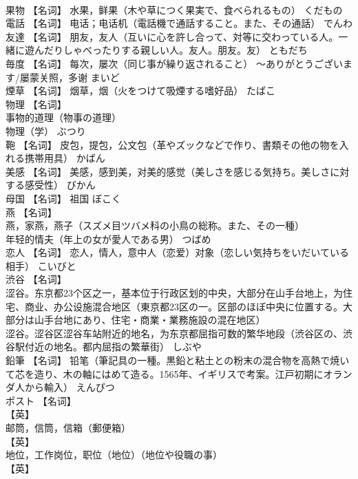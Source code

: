 \documentclass[8pt]{extreport}
\begin{document}
\begin{CJK}{UTF8}{min}
\\	果物	【名词】 水果，鲜果（木や草につく果実で、食べられるもの）	くだもの	
\\	電話	【名词】 电话；电话机（電話機で通話すること。また、その通話）	でんわ	
\\	友達	【名词】 朋友，友人（互いに心を許し合って、対等に交わっている人。一緒に遊んだりしゃべったりする親しい人。友人。朋友。友）	ともだち	
\\	毎度	【名词】 每次，屡次（同じ事が繰り返されること） ～ありがとうございます/屡蒙关照，多谢	まいど	
\\	煙草	【名词】 烟草，烟（火をつけて吸煙する嗜好品）	たばこ	
\\	物理	【名词】 
\\	事物的道理（物事の道理） 
\\	物理（学）	ぶつり	
\\	鞄	【名词】 皮包，提包，公文包（革やズックなどで作り、書類その他の物を入れる携帯用具）	かばん	
\\	美感	【名词】 美感，感到美，对美的感觉（美しさを感じる気持ち。美しさに対する感受性）	びかん	
\\	母国	【名词】 祖国	ぼこく	
\\	燕	【名词】 
\\	燕，家燕，燕子（スズメ目ツバメ科の小鳥の総称。また、その一種） 
\\	年轻的情夫（年上の女が愛人である男）	つばめ	
\\	恋人	【名词】 恋人，情人，意中人（恋爱）对象（恋しい気持ちをいだいている相手）	こいびと	
\\	渋谷	【名词】 
\\	涩谷。东京都23个区之一，基本位于行政区划的中央，大部分在山手台地上，为住宅、商业、办公设施混合地区（東京都23区の一。区部のほぼ中央に位置する。大部分は山手台地にあり、住宅・商業・業務施設の混在地区） 
\\	涩谷。涩谷区涩谷车站附近的地名，为东京都屈指可数的繁华地段（渋谷区の、渋谷駅付近の地名。都内屈指の繁華街）	しぶや	
\\	鉛筆	【名词】 铅笔（筆記具の一種。黒鉛と粘土との粉末の混合物を高熱で焼いて芯を造り、木の軸にはめて造る。1565年、イギリスで考案。江戸初期にオランダ人から輸入）	えんぴつ	
\\	ポスト	【名词】 
\\	【英】
\\	邮筒，信筒，信箱（郵便箱） 
\\	【英】
\\	地位，工作岗位，职位（地位）（地位や役職の事） 
\\	【英】

\end{CJK}
\end{document}

